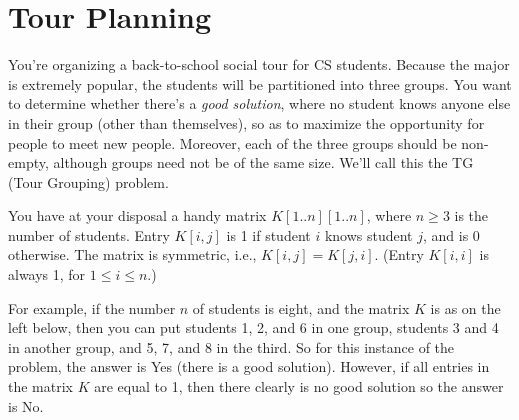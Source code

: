 \documentclass[11pt,fleqn]{exam}
\begin{document}
\section{Tour Planning}

You're organizing a back-to-school social tour for CS students. Because the major is extremely popular, the students will be partitioned into three groups. You want to determine whether there's a {\em good solution}, where no student knows anyone else in their group (other than themselves), so as to maximize the opportunity for people to meet new people. Moreover, each of the three groups should be non-empty, although groups need not be of the same size. We'll call this the TG (Tour Grouping) problem.

You have at your disposal a handy matrix $K[1..n][1..n]$, where $n\ge 3$ is the number of students. Entry $K[i,j]$ is 1 if student $i$ knows student $j$, and is 0 otherwise. The matrix is symmetric, i.e., $K[i,j] = K[j,i]$. (Entry $K[i,i]$ is always 1, for $1 \le i \le n$.)

For example, if the number $n$ of students is eight, and the matrix $K$ is as on the left below, then you can put students 1, 2, and 6 in one group, students 3 and 4 in another group, and 5, 7, and 8 in the third. So for this instance of the problem, the answer is Yes (there is a good solution). However, if all entries in the matrix $K$ are equal to 1, then there clearly is no good solution so the answer is No.
\end{document}
